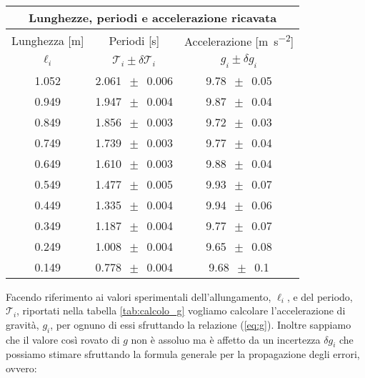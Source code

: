 \begin{SCtable}
    \centering
    \begin{tabular}{c c c}
        \multicolumn{3}{c}{\textbf{Lunghezze, periodi e accelerazione ricavata}} \\
        \toprule
        Lunghezza [\si{\metre}] & Periodi [\si{\second}] & Accelerazione [\si{\metre\per\square\second}] \\ %
        $\ell_i$ & $\mathcal{T}_i \pm \delta\mathcal{T}_i$ & $g_i \pm \delta g_i$ \\
        \midrule
			1.052 & 2.061 $\,\pm\,$ 0.006 & 9.78 $\,\pm\,$ 0.05 \\
			0.949 & 1.947 $\,\pm\,$ 0.004 & 9.87 $\,\pm\,$ 0.04 \\
			0.849 & 1.856 $\,\pm\,$ 0.003 & 9.72 $\,\pm\,$ 0.03 \\
			0.749 & 1.739 $\,\pm\,$ 0.003 & 9.77 $\,\pm\,$ 0.04 \\
			0.649 & 1.610 $\,\pm\,$ 0.003 & 9.88 $\,\pm\,$ 0.04 \\
			0.549 & 1.477 $\,\pm\,$ 0.005 & 9.93 $\,\pm\,$ 0.07 \\
			0.449 & 1.335 $\,\pm\,$ 0.004 & 9.94 $\,\pm\,$ 0.06 \\
			0.349 & 1.187 $\,\pm\,$ 0.004 & 9.77 $\,\pm\,$ 0.07 \\
			0.249 & 1.008 $\,\pm\,$ 0.004 & 9.65 $\,\pm\,$ 0.08 \\
			0.149 & 0.778 $\,\pm\,$ 0.004 & 9.68 $\,\pm\,$ 0.1 \\
        \bottomrule
    \end{tabular}
    \caption{In questa tebella sono riportate nella prima colonna le misure della lunghezza del filo che sono tutte affette da un'incertezza di 0.0006 m ricavata nel paragrafo precedente al punto \ref{l_medie}. Nella seconda colonna sono riportati i valori medi del periodo di oscillazione del pendolo relativo a ciascuna lunghezza. Infine nella terza colonna sono riportati i valori di $g_i$ derivanti dai dati grazie alle equazioni (\ref{eq:g}) e (\ref{eq:delta_g}). Per maggiori informazioni sulle prime due colonne si faccia riferimento alla Tabella \ref{tab:l_dati}, che commenta anche l'origine delle misure e la loro incertezza.}
    \label{tab:calcolo_g}
\end{SCtable}

Facendo riferimento ai valori sperimentali dell'allungamento, $\ell_i$, e del periodo, $\mathcal{T}_i$, riportati nella tabella \ref{tab:calcolo_g} vogliamo calcolare l'accelerazione di gravità, $g_i$, per ognuno di essi sfruttando la relazione (\ref{eq:g}). Inoltre sappiamo che il valore così rovato di $g$ non è assoluo ma è affetto da un incertezza $\delta g_i$ che possiamo stimare sfruttando la formula generale per la propagazione degli errori, ovvero:

